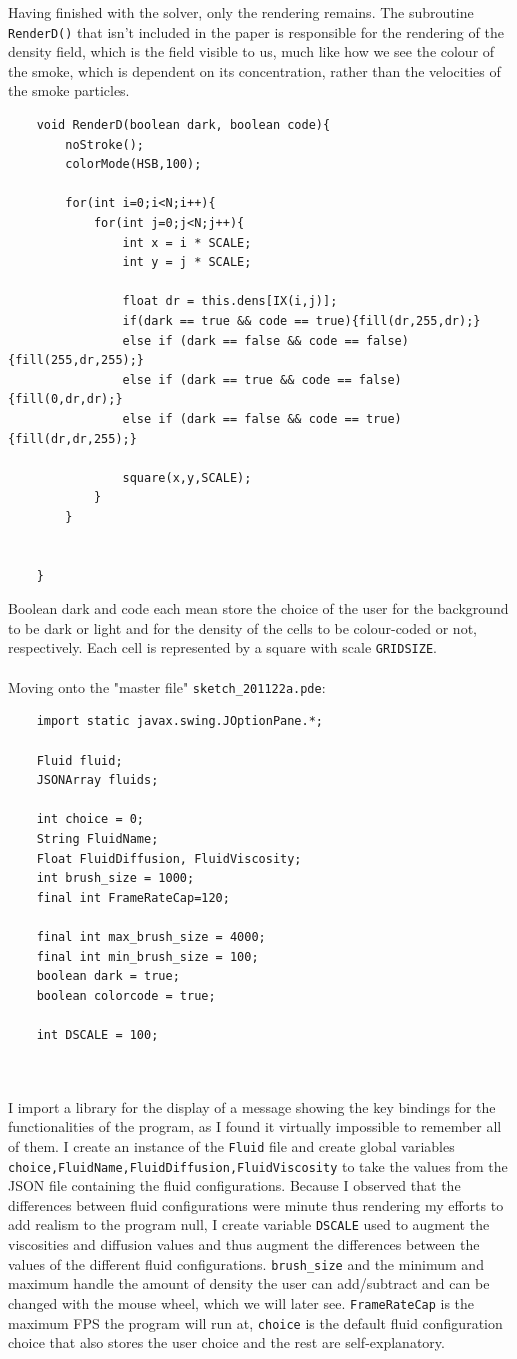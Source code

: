 \documentclass[12pt,a4paper]{book}
\begin{document}
Having finished with the solver, only the rendering remains. The subroutine \verb|RenderD()| that isn't included in the paper\cite{josrtfdg} is responsible for the rendering of the density field, which is the field visible to us, much like how we see the colour of the smoke, which is dependent on its concentration, rather than the velocities of the smoke particles.
\begin{lstlisting}
	void RenderD(boolean dark, boolean code){
		noStroke();
		colorMode(HSB,100);
		
		for(int i=0;i<N;i++){
			for(int j=0;j<N;j++){
				int x = i * SCALE;
				int y = j * SCALE;
				
				float dr = this.dens[IX(i,j)];
				if(dark == true && code == true){fill(dr,255,dr);}
				else if (dark == false && code == false){fill(255,dr,255);}
				else if (dark == true && code == false){fill(0,dr,dr);}
				else if (dark == false && code == true){fill(dr,dr,255);}
				
				square(x,y,SCALE);
			}
		}
		
		
	}
\end{lstlisting}
Boolean dark and code each mean store the choice of the user for the background to be dark or light and for the density of the cells to be colour-coded or not, respectively. Each cell is represented by a square with scale \verb|GRIDSIZE|. \\
\\
Moving onto the "master file" \verb|sketch_201122a.pde|:
\begin{lstlisting}
	import static javax.swing.JOptionPane.*;
	
	Fluid fluid;
	JSONArray fluids;
	
	int choice = 0;
	String FluidName;
	Float FluidDiffusion, FluidViscosity;
	int brush_size = 1000;
	final int FrameRateCap=120;
	
	final int max_brush_size = 4000;
	final int min_brush_size = 100;
	boolean dark = true;
	boolean colorcode = true;
	
	int DSCALE = 100;
	
	
\end{lstlisting}
I import a library for the display of a message showing the key bindings for the functionalities of the program, as I found it virtually impossible to remember all of them. I create an instance of the \verb|Fluid| file and create global variables \verb|choice,FluidName,FluidDiffusion,FluidViscosity| to take the values from the JSON file containing the fluid configurations. Because I observed that the differences between fluid configurations were minute thus rendering my efforts to add realism to the program null, I create variable \verb|DSCALE| used to augment the viscosities and diffusion values and thus augment the differences between the values of the different fluid configurations. \verb|brush_size| and the minimum and maximum handle the amount of density the user can add/subtract and can be changed with the mouse wheel, which we will later see. \verb|FrameRateCap| is the maximum FPS the program will run at, \verb|choice| is the default fluid configuration choice that also stores the user choice and the rest are self-explanatory.\\
\end{document}
